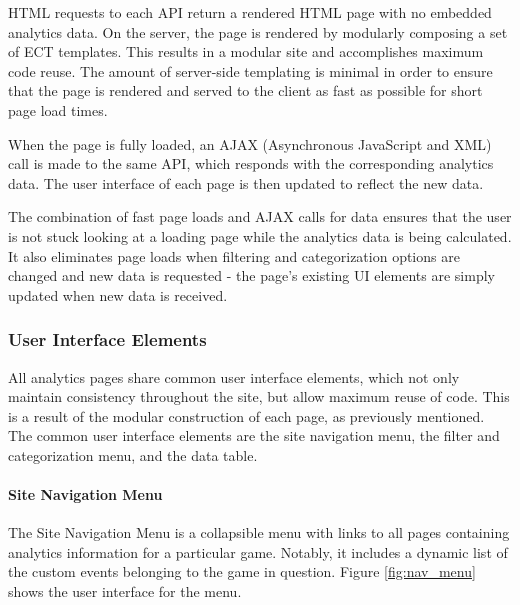HTML requests to each API return a rendered HTML page with no embedded analytics data. On the server, the page is rendered by modularly composing a set of ECT templates. This results in a modular site and accomplishes maximum code reuse. The amount of server-side templating is minimal in order to ensure that the page is rendered and served to the client as fast as possible for short page load times.

When the page is fully loaded, an AJAX (Asynchronous JavaScript and XML) call is made to the same API, which responds with the corresponding analytics data. The user interface of each page is then updated to reflect the new data. 

The combination of fast page loads and AJAX calls for data ensures that the user is not stuck looking at a loading page while the analytics data is being calculated. It also eliminates page loads when filtering and categorization options are changed and new data is requested - the page's existing UI elements are simply updated when new data is received.

\subsubsection{User Interface Elements}

All analytics pages share common user interface elements, which not only maintain consistency throughout the site, but allow maximum reuse of code. This is a result of the modular construction of each page, as previously mentioned. The common user interface elements are the site navigation menu, the filter and categorization menu, and the data table. 

\paragraph{Site Navigation Menu}

The Site Navigation Menu is a collapsible menu with links to all pages containing analytics information for a particular game. Notably, it includes a dynamic list of the custom events belonging to the game in question. Figure \ref{fig:nav_menu} shows the user interface for the menu.

